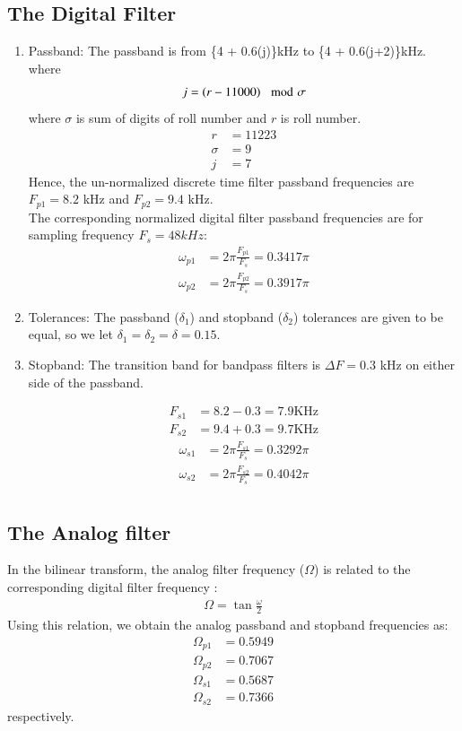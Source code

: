 \documentclass{article}
\begin{document}
\subsection{The Digital Filter}
\begin{enumerate}
\item {Passband:}
The passband is from \{4 + 0.6(j)\}kHz to \{4 + 0.6(j+2)\}kHz. \\
where
\begin{align}
    j=\left(r-11000\right) \mod \sigma
\end{align}
where $\sigma$ is sum of digits of roll number and $r$ is roll number.\\
\begin{align}
    r &= 11223\\
    \sigma &= 9\\
    j &= 7
\end{align}
Hence, the un-normalized discrete time filter passband frequencies are $F_{p1} = 8.2$ kHz
and $F_{p2} = 9.4$ kHz. \\
The corresponding normalized digital filter passband frequencies are for sampling frequency $F_s = 48 kHz$:
\begin{align}
    \omega_{p1} &= 2\pi\frac{F_{p1}}{F_s} = 0.3417 \pi\\
    \omega_{p2} &= 2\pi\frac{F_{p2}}{F_s} = 0.3917 \pi
\end{align}

\item {Tolerances:} The passband ($\delta_1$) and stopband ($\delta_2$) tolerances are given to
be equal, so we let $\delta_1 = \delta_2 = \delta = 0.15$.

\item {Stopband:} The {transition band} for bandpass filters is $\Delta F = 0.3$ kHz on either side of the passband.

\begin{align}
    F_{s1} &= 8.2-0.3 = 7.9 \text{KHz}\\
    F_{s2} &= 9.4+0.3 = 9.7 \text{KHz}
\end{align}
\begin{align}
    \omega_{s1} &= 2\pi\frac{F_{s1}}{F_s} = 0.3292 \pi\\
    \omega_{s2} &= 2\pi\frac{F_{s2}}{F_s} = 0.4042 \pi\\
\end{align}
\end{enumerate}
\subsection{The Analog filter}
In the bilinear transform, the analog filter frequency ($\Omega$) is related to the corresponding digital filter frequency\brak{\omega} :
\begin{align}
  \Omega = \tan \frac{\omega}{2}
\end{align}
Using this relation, we obtain the analog passband and stopband frequencies as:
\begin{align}
    \Omega_{p1} &= 0.5949\\
    \Omega_{p2} &= 0.7067\\
    \Omega_{s1} &= 0.5687\\
    \Omega_{s2} &= 0.7366
\end{align}
respectively.
\end{document}
